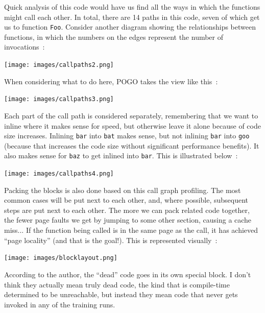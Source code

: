\documentclass[a4paper]{report}
\begin{document}
Quick analysis of this code would have us find all the ways in which the functions might call each other. In total, there are 14 paths in this code, seven of which get us to function \texttt{Foo}. Consider another diagram showing the relationships between functions, in which the numbers on the edges represent the number of invocations~\cite{pogo2}:

\begin{center}
	\texttt{[image: images/callpaths2.png]}
\end{center}

When considering what to do here, POGO takes the view like this~\cite{pogo2}:

\begin{center}
	\texttt{[image: images/callpaths3.png]}
\end{center}

Each part of the call path is considered separately, remembering that we want to inline where it makes sense for speed, but otherwise leave it alone because of code size increases. Inlining \texttt{bar} into \texttt{bat} makes sense, but not inlining \texttt{bar} into \texttt{goo} (because that increases the code size without significant performance benefits). It also makes sense for \texttt{baz} to get inlined into \texttt{bar}. This is illustrated below~\cite{pogo2}:

\begin{center}
	\texttt{[image: images/callpaths4.png]}
\end{center}

Packing the blocks is also done based on this call graph profiling. The most common cases will be put next to each other, and, where possible, subsequent steps are put next to each other. The more we can pack related code together, the fewer page faults we get by jumping to some other section, causing a cache miss... If the function being called is in the same page as the call, it has achieved ``page locality'' (and that is the goal!). This is represented visually~\cite{pogo2}:

\begin{center}
	\texttt{[image: images/blocklayout.png]}
\end{center}

According to the author, the ``dead'' code goes in its own special block. I don't think they actually mean truly dead code, the kind that is compile-time determined to be unreachable, but instead they mean code that never gets invoked in any of the training runs.
\end{document}
